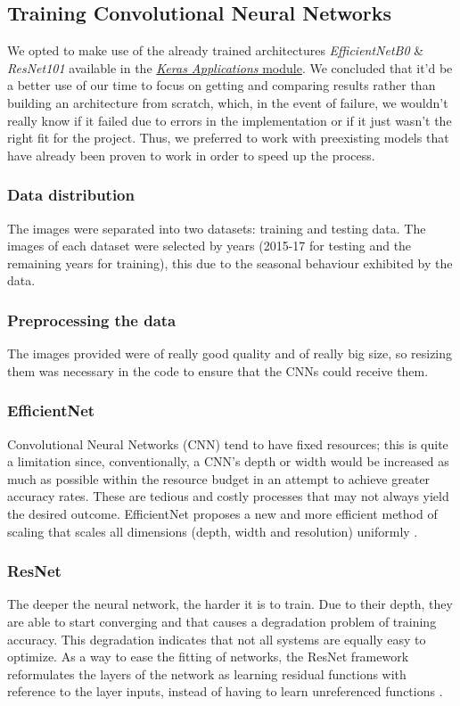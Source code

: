 \documentclass[conference]{IEEEtran}
\begin{document}
\subsection{\textbf{Training Convolutional Neural Networks}}
We opted to make use of the already trained architectures \textit{EfficientNetB0} \& \textit{ResNet101} available in the \href{https://www.tensorflow.org/api_docs/python/tf/keras/applications}{\textit{Keras Applications} module}. We concluded that it'd be a better use of our time to focus on getting and comparing results rather than building an architecture from scratch, which, in the event of failure, we wouldn't really know if it failed due to errors in the implementation or if it just wasn't the right fit for the project. Thus, we preferred to work with preexisting models that have already been proven to work in order to speed up the process.
\subsubsection{Data distribution}
The images were separated into two datasets: training and testing data. The images of each dataset were selected by years (2015-17 for testing and the remaining years for training), this due to the seasonal behaviour exhibited by the data.
\subsubsection{Preprocessing the data}
The images provided were of really good quality and of really big size, so resizing them was necessary in the code to ensure that the CNNs could receive them.
\subsubsection{EfficientNet}
Convolutional Neural Networks (CNN) tend to have fixed resources; this is quite a limitation since, conventionally, a CNN's depth or width would be increased as much as possible within the resource budget in an attempt to achieve greater accuracy rates. These are tedious and costly processes that may not always yield the desired outcome. EfficientNet proposes a new and more efficient method of scaling that scales all dimensions (depth, width and resolution) uniformly \cite{efficient-net}.
\subsubsection{ResNet}
The deeper the neural network, the harder it is to train. Due to their depth, they are able to start converging and that causes a degradation problem of training accuracy. This degradation indicates that not all systems are equally easy to optimize. As a way to ease the fitting of networks, the ResNet framework reformulates the layers of the network as learning residual functions with reference to the layer inputs, instead of having to learn unreferenced functions \cite{res-net}.
\end{document}
